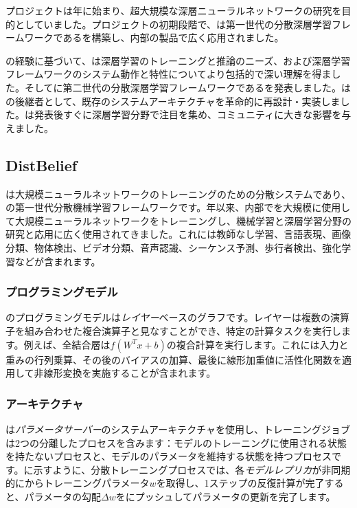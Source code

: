 \begin{content}

プロジェクトは年に始まり、超大規模な深層ニューラルネットワークの研究を目的としていました。プロジェクトの初期段階で、は第一世代の分散深層学習フレームワークであるを構築し、内部の製品で広く応用されました。

の経験に基づいて、は深層学習のトレーニングと推論のニーズ、および深層学習フレームワークのシステム動作と特性についてより包括的で深い理解を得ました。そしてに第二世代の分散深層学習フレームワークである\tf{}を発表しました。\tf{}はの後継者として、既存のシステムアーキテクチャを革命的に再設計・実装しました。\tf{}は発表後すぐに深層学習分野で注目を集め、コミュニティに大きな影響を与えました。

\subsection{DistBelief}

は大規模ニューラルネットワークのトレーニングのための分散システムであり、の第一世代分散機械学習フレームワークです。年以来、内部でを大規模に使用して大規模ニューラルネットワークをトレーニングし、機械学習と深層学習分野の研究と応用に広く使用されてきました。これには教師なし学習、言語表現、画像分類、物体検出、ビデオ分類、音声認識、シーケンス予測、歩行者検出、強化学習などが含まれます。

\subsubsection{プログラミングモデル}

のプログラミングモデルは\emph{レイヤー}ベースのグラフです。レイヤーは複数の演算子を組み合わせた複合演算子と見なすことができ、特定の計算タスクを実行します。例えば、全結合層は$f({W^T}x + b)$の複合計算を実行します。これには入力と重みの行列乗算、その後のバイアスの加算、最後に線形加重値に活性化関数を適用して非線形変換を実施することが含まれます。

\subsubsection{アーキテクチャ}

は\emph{パラメータサーバー}のシステムアーキテクチャを使用し、トレーニングジョブは2つの分離したプロセスを含みます：モデルのトレーニングに使用される状態を持たないプロセスと、モデルのパラメータを維持する状態を持つプロセスです。に示すように、分散トレーニングプロセスでは、各\emph{モデルレプリカ}が非同期的にからトレーニングパラメータ$w$を取得し、1ステップの反復計算が完了すると、パラメータの勾配$ \Delta w $をにプッシュしてパラメータの更新を完了します。


\end{content}
